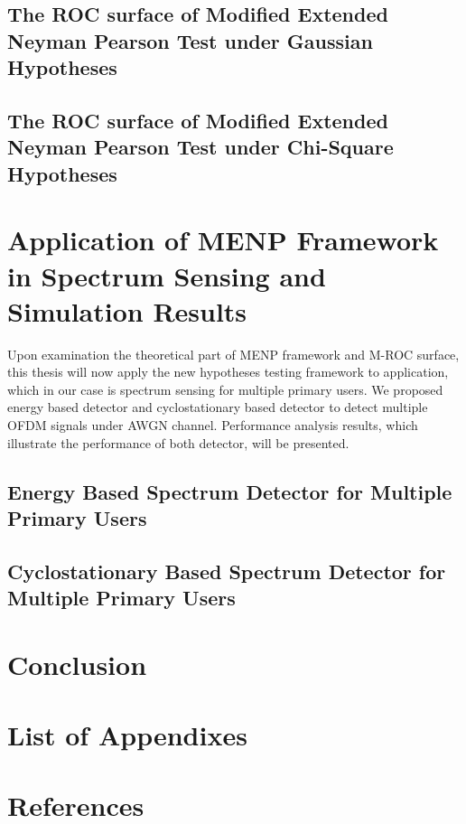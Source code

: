 \documentclass{article}
\begin{document}
\begin{spacing}{2.0}
\subsection{The ROC surface of Modified Extended Neyman Pearson Test under Gaussian Hypotheses}
\subsection{The ROC surface of Modified Extended Neyman Pearson Test under Chi-Square Hypotheses}
\newpage
\section{Application of MENP Framework in Spectrum Sensing and Simulation Results}
Upon examination the theoretical part of MENP framework and M-ROC surface, this thesis will now apply the new hypotheses testing framework to application, which in our case is spectrum sensing for multiple primary users. We proposed energy based detector and cyclostationary based detector to detect multiple OFDM signals under AWGN channel. Performance analysis results, which illustrate the performance of both detector, will be presented.   
\subsection{Energy Based Spectrum Detector for Multiple Primary Users}
\subsection{Cyclostationary Based Spectrum Detector for Multiple Primary Users}
\newpage
\section{ Conclusion}
\section{List of Appendixes}
\section{References}
\newpage
\end{spacing}
\end{document}
